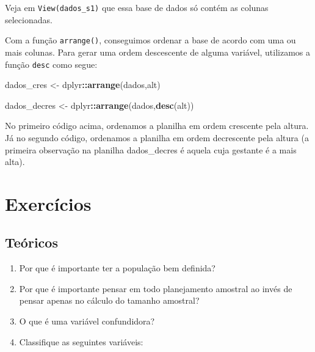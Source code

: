 \documentclass[
]{book}
\newenvironment{Shaded}{\begin{snugshade}}{\end{snugshade}}
\newcommand{\KeywordTok}[1]{\textcolor[rgb]{0.13,0.29,0.53}{\textbf{#1}}}
\newcommand{\NormalTok}[1]{#1}
\newcommand{\OperatorTok}[1]{\textcolor[rgb]{0.81,0.36,0.00}{\textbf{#1}}}
\newcommand{\StringTok}[1]{\textcolor[rgb]{0.31,0.60,0.02}{#1}}
\begin{document}
Veja em \texttt{View(dados\_s1)} que essa base de dados só contém as colunas selecionadas.

Com a função \texttt{arrange()}, conseguimos ordenar a base de acordo com uma ou mais colunas. Para gerar uma ordem descescente de alguma variável, utilizamos a função \texttt{desc} como segue:

\begin{Shaded}
\begin{Highlighting}[]
\NormalTok{dados_cres <-}\StringTok{ }\NormalTok{dplyr}\OperatorTok{::}\KeywordTok{arrange}\NormalTok{(dados,alt)}
\end{Highlighting}
\end{Shaded}

\begin{Shaded}
\begin{Highlighting}[]
\NormalTok{dados_decres <-}\StringTok{ }\NormalTok{dplyr}\OperatorTok{::}\KeywordTok{arrange}\NormalTok{(dados,}\KeywordTok{desc}\NormalTok{(alt))}
\end{Highlighting}
\end{Shaded}

No primeiro código acima, ordenamos a planilha em ordem crescente pela altura. Já no segundo código, ordenamos a planilha em ordem decrescente pela altura (a primeira observação na planilha dados\_decres é aquela cuja gestante é a mais alta).

\hypertarget{exercuxedcios}{%
\section{Exercícios}\label{exercuxedcios}}

\hypertarget{teuxf3ricos}{%
\subsection{Teóricos}\label{teuxf3ricos}}

\begin{enumerate}
\def\labelenumi{\arabic{enumi}.}
\item
  Por que é importante ter a população bem definida?
\item
  Por que é importante pensar em todo planejamento amostral ao
  invés de pensar apenas no cálculo do tamanho amostral?
\item
  O que é uma variável confundidora?
\item
  Classifique as seguintes variáveis:
\end{enumerate}
\end{document}
